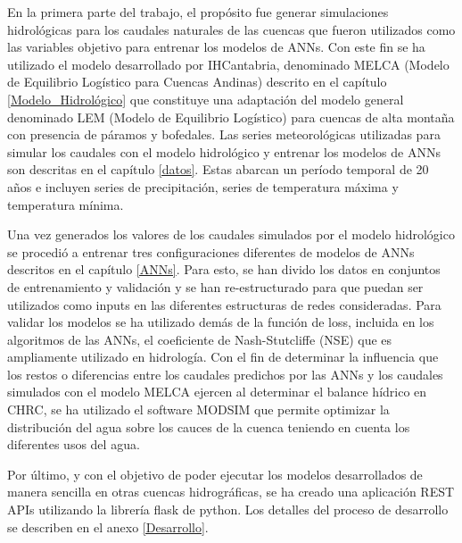En la primera parte del trabajo, el propósito fue generar simulaciones hidrológicas para los caudales naturales de las cuencas 
que fueron utilizados como las variables objetivo para entrenar los modelos de ANNs. Con este fin se ha utilizado el modelo 
desarrollado por IHCantabria, denominado MELCA (Modelo de Equilibrio Logístico para Cuencas Andinas) descrito en el capítulo \ref{Modelo_Hidrológico} 
que constituye una adaptación del modelo general denominado LEM (Modelo de Equilibrio Logístico) para cuencas 
de alta montaña con presencia de páramos y bofedales. Las series meteorológicas utilizadas para simular los caudales con el modelo hidrológico 
y entrenar los modelos de ANNs son descritas en el capítulo \ref{datos}. Estas abarcan un período temporal de 20 años e incluyen series de 
precipitación, series de temperatura máxima y temperatura mínima.  

Una vez generados los valores de los caudales simulados por el modelo hidrológico se procedió a entrenar tres configuraciones
diferentes de modelos de ANNs descritos en el capítulo \ref{ANNs}. Para esto, se han divido los datos en conjuntos de entrenamiento y 
validación y se han re-estructurado para que puedan ser utilizados como inputs en las diferentes estructuras de redes consideradas. 
Para validar los modelos se ha utilizado demás de la función de loss, incluida en los algoritmos de las ANNs, el coeficiente de
Nash-Stutcliffe (NSE) que es ampliamente utilizado en hidrología. Con el fin de determinar 
la influencia que los restos o diferencias entre los caudales predichos por las ANNs y los caudales simulados con 
el modelo MELCA ejercen al determinar el balance hídrico en CHRC, se ha utilizado el software MODSIM que permite 
optimizar la distribución del agua sobre los cauces de la cuenca teniendo en cuenta los diferentes usos del agua.

Por último, y con el objetivo de poder ejecutar los modelos desarrollados de manera sencilla en otras cuencas hidrográficas, se ha creado
una aplicación REST APIs  utilizando la librería flask de python. Los detalles del proceso de desarrollo se describen en el anexo \ref{Desarrollo}.













